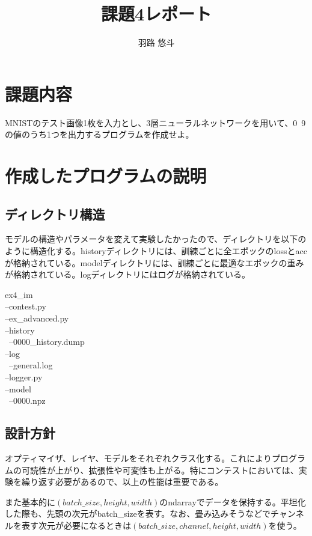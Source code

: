 \documentclass[platex,dvipdfmx]{jsarticle}
\begin{document}
\title{課題4レポート}
\author{羽路 悠斗}
\maketitle

\section{課題内容}

MNISTのテスト画像1枚を入力とし、3層ニューラルネットワークを用いて、0~9の値のうち1つを出力するプログラムを作成せよ。

\section{作成したプログラムの説明}

\subsection{ディレクトリ構造}

モデルの構造やパラメータを変えて実験したかったので、ディレクトリを以下のように構造化する。historyディレクトリには、訓練ごとに全エポックのlossとaccが格納されている。modelディレクトリには、訓練ごとに最適なエポックの重みが格納されている。logディレクトリにはログが格納されている。

\noindent
ex4\_im \\
\textbar --contest.py \\
\textbar --ex\_advanced.py \\
\textbar --history \\
\textbar \, \textbar --0000\_history.dump \\
\textbar --log \\
\textbar \, \textbar --general.log \\
\textbar --logger.py \\
\textbar --model \\
\textbar \, \textbar --0000.npz \\

\subsection{設計方針}

オプティマイザ、レイヤ、モデルをそれぞれクラス化する。これによりプログラムの可読性が上がり、拡張性や可変性も上がる。特にコンテストにおいては、実験を繰り返す必要があるので、以上の性能は重要である。

また基本的に$(batch\_size, height, width)$のndarrayでデータを保持する。平坦化した際も、先頭の次元がbatch\_sizeを表す。なお、畳み込みそうなどでチャンネルを表す次元が必要になるときは$(batch\_size, channel, height, width)$を使う。
\end{document}
